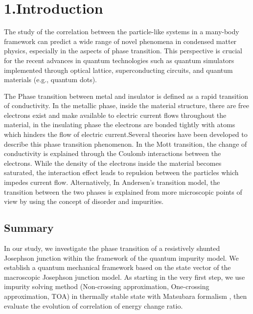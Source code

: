\documentclass{article}[12pt]
\begin{document}
\section*{1.Introduction}
\begin{spacing}{1.5}

The study of the correlation between the particle-like systems in a many-body framework can predict a wide range of novel phenomena in condensed matter physics, especially in the aspects of phase transition. 
This perspective is crucial for the recent advances in quantum technologies such as quantum simulators implemented through optical lattice, superconducting circuits, and quantum materials (e.g., quantum dots).

The Phase transition between metal and insulator is defined as a rapid transition of conductivity. In the metallic phase, inside the material structure, there are free electrons exist and make available to electric current flows throughout the material, in the insulating phase the electrons are bonded tightly with atoms which hinders the flow of electric current.Several theories have been developed to describe this phase transition phenomenon. In the Mott transition, the change of conductivity is explained through the Coulomb interactions between the electrons. While the density of the electrons inside the material becomes saturated, the interaction effect leads to repulsion between the particles which impedes current flow. Alternatively, In Andersen's transition model, the transition between the two phases is explained from more microscopic points of view by using the concept of disorder and impurities.

\subsection*{Summary}
In our study, we investigate the phase transition of a resistively shunted Josephson junction within the framework of the quantum impurity model. 
We establish a quantum mechanical framework based on the state vector of the macroscopic Josephson junction model. 
As starting in the very first step, we use impurity solving method (Non-crossing approximation, One-crossing approximation, TOA) in thermally stable state with Matsubara formalism , then evaluate the evolution of correlation of energy change ratio.


\end{spacing}
\end{document}
